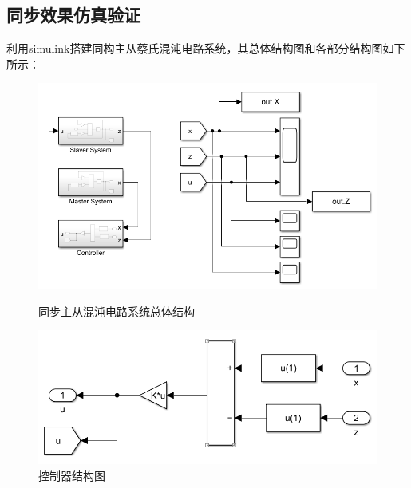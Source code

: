 \documentclass[UTF8]{article}
\begin{document}
\subsection{同步效果仿真验证}
利用simulink搭建同构主从蔡氏混沌电路系统，其总体结构图和各部分结构图如下所示：
\begin{figure}[htbp]
	\centering
	\begin{minipage}{0.49\linewidth}
		\centering
		\includegraphics[width=0.9\linewidth]{figure/混沌电路-总体.png}
		\caption{同步主从混沌电路系统总体结构}
	\end{minipage}
	\begin{minipage}{0.49\linewidth}
		\centering
		\includegraphics[width=0.9\linewidth]{figure/混沌电路-controler.png}
		\caption{控制器结构图}
	\end{minipage}
\end{figure}
\end{document}
